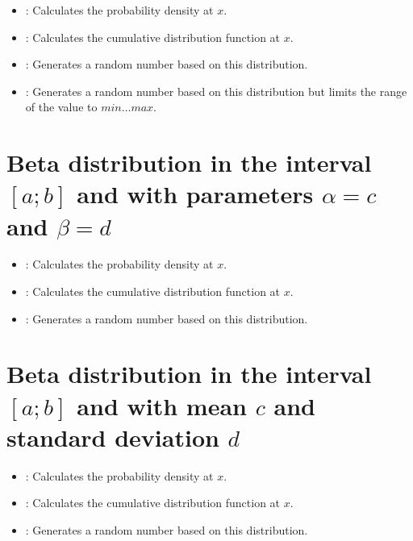 \begin{itemize}

\item
{}:
Calculates the probability density at $x$.

\item
{}:
Calculates the cumulative distribution function at $x$.

\item
{}:
Generates a random number based on this distribution.

\item
{}:
Generates a random number based on this distribution but limits the range of the value to $min\ldots max$.

\end{itemize}



\section{Beta distribution in the interval \texorpdfstring{$[a;b]$}{[a;b]} and with parameters \texorpdfstring{$\alpha=c$}{c} and \texorpdfstring{$\beta=d$}{d}}

\begin{itemize}

\item
{}:
Calculates the probability density at $x$.

\item
{}:
Calculates the cumulative distribution function at $x$.

\item
{}:
Generates a random number based on this distribution.

\end{itemize}



\section{Beta distribution in the interval \texorpdfstring{$[a;b]$}{[a;b]} and with mean \texorpdfstring{$c$}{c} and standard deviation \texorpdfstring{$d$}{d}}

\begin{itemize}

\item
{}:
Calculates the probability density at $x$.

\item
{}:
Calculates the cumulative distribution function at $x$.

\item
{}:
Generates a random number based on this distribution.

\end{itemize}



